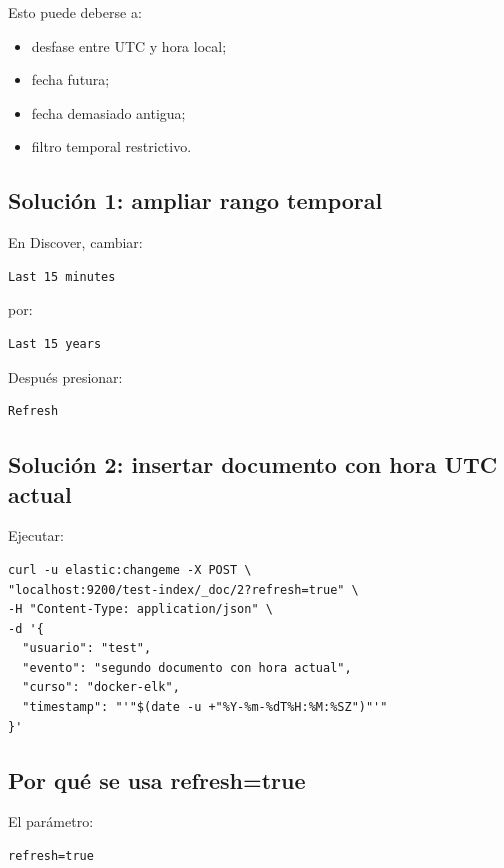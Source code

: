 \documentclass[
  coursetitle={Cómputo Nube y Tecnologías Emergentes},
  coursehours={96},
  coursedate={Verano 2026},
  doctype={Laboratorio},
  otherlangs={english,french},
  authorname={Lázaro},
  authorsurname={Bustio-Martínez},
  authortitle={PhD},
  role={Profesor Investigador},
  email={lbustio@inaoe.mx},
  phone={5559504000},
  ext={7459},
  institution={Instituto Nacional de Astrofísica, Óptica y Electrónica (INAOE)},
  department={Maestría en Ciencias en Tecnologías de Seguridad},
  address={Luis Enrique Erro 1, Sta. Ma. Tonantzintla, San Andrés Cholula, CP 72840, Puebla, México},
  margin={0.5in}
]{../../lbustio_lecture_notes}
\begin{document}
Esto puede deberse a:

\begin{itemize}
    \item desfase entre UTC y hora local;
    \item fecha futura;
    \item fecha demasiado antigua;
    \item filtro temporal restrictivo.
\end{itemize}

\subsection{Solución 1: ampliar rango temporal}

En Discover, cambiar:

\begin{verbatim}
Last 15 minutes
\end{verbatim}

por:

\begin{verbatim}
Last 15 years
\end{verbatim}

Después presionar:

\begin{verbatim}
Refresh
\end{verbatim}

\subsection{Solución 2: insertar documento con hora UTC actual}

Ejecutar:

\begin{lstlisting}
curl -u elastic:changeme -X POST \
"localhost:9200/test-index/_doc/2?refresh=true" \
-H "Content-Type: application/json" \
-d '{
  "usuario": "test",
  "evento": "segundo documento con hora actual",
  "curso": "docker-elk",
  "timestamp": "'"$(date -u +"%Y-%m-%dT%H:%M:%SZ")"'"
}'
\end{lstlisting}

\subsection{Por qué se usa refresh=true}

El parámetro:

\begin{verbatim}
refresh=true
\end{verbatim}
\end{document}

